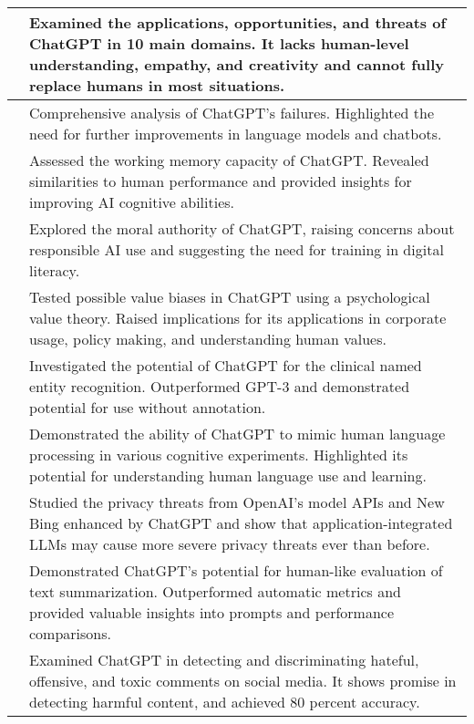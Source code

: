 \documentclass[11pt]{article}
\begin{document}
\begin{table*}
{\begin{tabular}{ll}
    \midrule
    \citet{bahrini2023chatgpt} &      Examined the applications, opportunities, and threats of ChatGPT in 10 main domains. It lacks human-level understanding, empathy, and creativity and cannot fully replace humans in most situations.\\
    \midrule
    \citet{borji2023categorical} &      Comprehensive analysis of ChatGPT's failures. Highlighted the need for further improvements in language models and chatbots.\\
    \midrule
    \citet{gong2023assessing} &      Assessed the working memory capacity of ChatGPT.  Revealed similarities to human performance and provided insights for improving AI cognitive abilities.\\
    \midrule
    \citet{krügel2023moral} &      Explored the moral authority of ChatGPT,  raising concerns about responsible AI use and suggesting the need for training in digital literacy.\\
    \midrule
    \citet{fischer2023does} &      Tested possible value biases in ChatGPT using a psychological value theory.  Raised implications for its applications in corporate usage, policy making, and understanding human values.\\
    \midrule
    \citet{hu2023zeroshot} &      Investigated the potential of ChatGPT for the clinical named entity recognition. Outperformed GPT-3 and demonstrated potential for use without annotation.\\  
    \midrule
    \citet{cai2023does} &      Demonstrated the ability of ChatGPT  to mimic human language processing in various cognitive experiments. Highlighted its potential for understanding human language use and learning.\\ 
    \midrule
    \citet{li2023multistep} &      Studied the privacy threats from OpenAI's model APIs and New Bing enhanced by ChatGPT and show that application-integrated LLMs may cause more severe privacy threats ever than before.\\ 
    \midrule
    \citet{gao2023humanlike} &      Demonstrated ChatGPT's potential for human-like evaluation of text summarization. Outperformed automatic metrics and provided valuable insights into prompts and performance comparisons.\\ 
    \midrule
    \citet{li2023hot} &      Examined ChatGPT in detecting and discriminating hateful, offensive, and toxic comments on social media. It shows promise in detecting harmful content, and achieved 80 percent accuracy.\\ 

\end{tabular}}
\end{table*}
\end{document}
